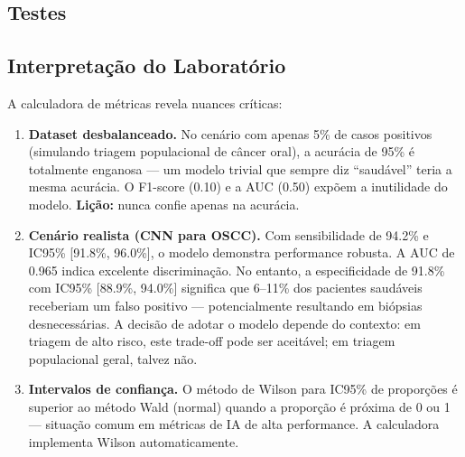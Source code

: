 
\subsection{Testes}



\subsection{Interpretação do Laboratório}

A calculadora de métricas revela nuances críticas:

\begin{enumerate}
    \item \textbf{Dataset desbalanceado.} No cenário com apenas 5\% de casos positivos (simulando triagem populacional de câncer oral), a acurácia de 95\% é totalmente enganosa — um modelo trivial que sempre diz ``saudável'' teria a mesma acurácia. O F1-score (0.10) e a AUC (0.50) expõem a inutilidade do modelo. \textbf{Lição:} nunca confie apenas na acurácia.

    \item \textbf{Cenário realista (CNN para OSCC).} Com sensibilidade de 94.2\% e IC95\% [91.8\%, 96.0\%], o modelo demonstra performance robusta. A AUC de 0.965 indica excelente discriminação. No entanto, a especificidade de 91.8\% com IC95\% [88.9\%, 94.0\%] significa que 6--11\% dos pacientes saudáveis receberiam um falso positivo — potencialmente resultando em biópsias desnecessárias. A decisão de adotar o modelo depende do contexto: em triagem de alto risco, este trade-off pode ser aceitável; em triagem populacional geral, talvez não.

    \item \textbf{Intervalos de confiança.} O método de Wilson para IC95\% de proporções é superior ao método Wald (normal) quando a proporção é próxima de 0 ou 1 — situação comum em métricas de IA de alta performance. A calculadora implementa Wilson automaticamente.
\end{enumerate}

